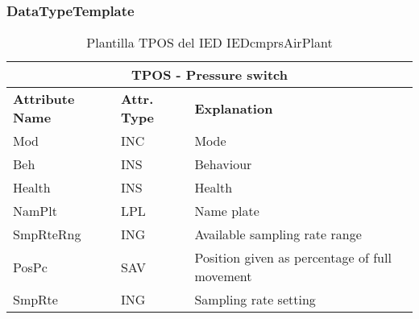     \subsubsection{DataTypeTemplate}
    \begin{table}[H]
    \begin{center}
    \begin{tabular}{|l|l|p{8.5cm}|}
            \hline
            \multicolumn{3}{|c|}{\cellcolor[gray]{0.8} \textbf{ TPOS}  - Pressure switch} \\
            \hline
            \textbf{Attribute Name} & \textbf{Attr. Type} & \textbf{Explanation} \\
            \hline 
            Mod & INC & Mode \\
            \hline
            Beh & INS & Behaviour \\
            \hline
            Health & INS & Health \\
            \hline
            NamPlt & LPL & Name plate \\
            \hline
            SmpRteRng & ING & Available sampling rate range \\
            \hline
            PosPc & SAV & Position given as percentage of full movement \\
            \hline
            SmpRte & ING & Sampling rate setting \\
            \hline
    \end{tabular}
    \caption{Plantilla TPOS del IED IEDcmprsAirPlant}
    \label{table:lnTypeTPOS_prs_sw}
    \end{center}
    \end{table}
    
    
    